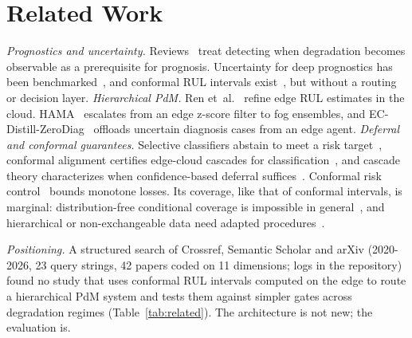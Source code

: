 \documentclass[conference]{IEEEtran}
\begin{document}
\section{Related Work}\label{sec:related}
\textit{Prognostics and uncertainty.} Reviews~\cite{lei2018machinery} treat detecting when degradation becomes observable as a prerequisite for prognosis. Uncertainty for deep prognostics has been benchmarked~\cite{basora2025benchmark}, and conformal RUL intervals exist~\cite{javanmardi2023conformal,wang2026conformal}, but without a routing or decision layer.
\textit{Hierarchical PdM.} Ren et~al.~\cite{ren2021cloudedge} refine edge RUL estimates in the cloud. HAMA~\cite{saleh2026hama} escalates from an edge z-score filter to fog ensembles, and EC-Distill-ZeroDiag~\cite{yao2026ecdistill} offloads uncertain diagnosis cases from an edge agent.
\textit{Deferral and conformal guarantees.} Selective classifiers abstain to meet a risk target~\cite{geifman2017selective}, conformal alignment certifies edge-cloud cascades for classification~\cite{huang2025cab}, and cascade theory characterizes when confidence-based deferral suffices~\cite{jitkrittum2023cascade}. Conformal risk control~\cite{angelopoulos2024crc} bounds monotone losses. Its coverage, like that of conformal intervals, is marginal: distribution-free conditional coverage is impossible in general~\cite{foygel2021limits}, and hierarchical or non-exchangeable data need adapted procedures~\cite{dunn2023hierarchical,barber2023beyond}.

\textit{Positioning.} A structured search of Crossref, Semantic Scholar and arXiv (2020-2026, 23 query strings, 42 papers coded on 11 dimensions; logs in the repository) found no study that uses conformal RUL intervals computed on the edge to route a hierarchical PdM system and tests them against simpler gates across degradation regimes (Table~\ref{tab:related}). The architecture is not new; the evaluation is.
\end{document}

